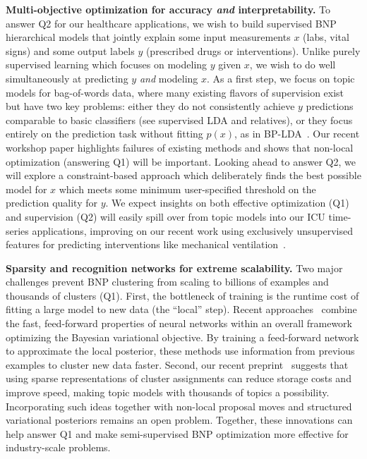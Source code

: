 \documentclass[11pt,letterpaper]{article}
\begin{document}
\textbf{Multi-objective optimization for accuracy \emph{and} interpretability.}
To answer Q2 for our healthcare applications, we wish to build supervised BNP hierarchical models that jointly explain some input measurements $x$ (labs, vital signs) and some output labels $y$ (prescribed drugs or interventions).
Unlike purely supervised learning which focuses on modeling $y$ given $x$, we wish to do well simultaneously at predicting $y$ \emph{and} modeling $x$.
As a first step, we focus on topic models for bag-of-words data, where many existing flavors of supervision exist but have two key problems: either they do not consistently achieve $y$ predictions comparable to basic classifiers (see supervised LDA \citep{blei2007sLDA} and relatives), or they focus entirely on the prediction task without fitting $p(x)$, as in BP-LDA~\citep{chen2015bplda}. 
Our recent workshop paper
\citep{hughes2016clinicalSLDA} highlights failures of existing methods and shows that non-local optimization (answering Q1) will be important. Looking ahead to answer Q2, we will explore a constraint-based approach which deliberately finds the best possible model for $x$ which meets some minimum user-specified threshold on the prediction quality for $y$. We expect insights on both effective optimization (Q1) and supervision (Q2) will easily spill over from topic models into our ICU time-series applications, improving on our recent work using exclusively unsupervised features for predicting interventions like mechanical ventilation~\citep{ghassemi2017ssam}.


\textbf{Sparsity and recognition networks for extreme scalability.}
Two major challenges prevent BNP clustering from scaling to billions of examples and thousands of clusters (Q1). First, the bottleneck of training is the runtime cost of fitting a large model to new data (the ``local'' step). Recent approaches~\citep{gan2015deepTSBN,mnih2014neuralVariational} combine the fast, feed-forward properties of neural networks within an overall framework optimizing the Bayesian variational objective. By training a feed-forward network to approximate the local posterior, these methods use information from previous examples to cluster new data faster. 
Second, our recent preprint~\citep{hughes2016sparse} suggests that using sparse representations of cluster assignments can reduce storage costs and improve speed, making topic models with thousands of topics a possibility.
Incorporating such ideas together with non-local proposal moves and structured variational posteriors remains an open problem. Together, these innovations can help answer Q1 and make semi-supervised BNP optimization more effective for industry-scale problems.
\end{document}
